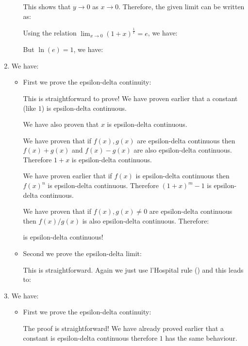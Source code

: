 \begin{enumerate}
\begin{itemize}
			This shows that $y \rightarrow 0$ as $x \rightarrow 0$. Therefore, the given limit can be written as:
			
			Using the relation $\lim _{x \rightarrow 0}(1+x)^{\frac{1}{x}}=e$, we have:
			
			But $\ln (e)=1$, we have:
			
		\end{itemize}
		
		\item We have:
		
		
		\begin{itemize}
			\item First we prove the epsilon-delta continuity:
			
			This is straightforward to prove! We have proven earlier that a constant (like $1$) is epsilon-delta continuous.
			
			We have also proven that $x$ is epsilon-delta continuous.
			
			We have proven that if $f(x),g(x)$ are epsilon-delta continuous then $f(x)+ g(x)$ and $f(x)-g(x)$ are  also epsilon-delta continuous. Therefore $1+x$ is epsilon-delta continuous.
			
			We have proven earlier that if $f(x)$ is epsilon-delta continuous then $f(x)^n$ is epsilon-delta continuous. Therefore $(1+x)^m-1$ is epsilon-delta continuous.
			
			We have proven that if $f(x),g(x)\neq 0$ are epsilon-delta continuous then $f(x)/g(x)$ is also epsilon-delta continuous. Therefore:
			
			is epsilon-delta continuous!
			
			\item Second we prove the epsilon-delta limit:
			
			This is straightforward. Again we just use l'Hospital rule () and this leads to:
			
		\end{itemize}
		
		\item We have:
		
		
		\begin{itemize}
			\item First we prove the epsilon-delta continuity:
			
			The proof is straightforward! We have already proved earlier that a constant is epsilon-delta continuous therefore $1$ has the same behaviour.
			

\end{itemize}
\end{enumerate}
